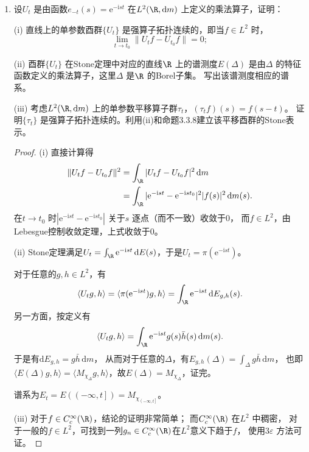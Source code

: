 \begin{enumerate}

\item[1]
设$ U_{t} $ 是由函数$ e_{-t}(s) = \mathrm{e}^{-\mathrm{i}st} $ 在$ L^{2}(\R, \mathrm{d}m) $ 上定义的乘法算子，证明：

(i) 直线上的单参数酉群$ \{U_{t}\} $ 是强算子拓扑连续的，即当$ f\in L^{2} $ 时，
$$\lim_{t\to t_{0}} \|U_{t}f-U_{t_{0}}f\| = 0;$$

(ii) 酉群$ \{U_{t}\} $ 在Stone定理中对应的直线$ \R $ 上的谱测度$ E(\Delta) $ 是由$ \Delta $ 的特征函数定义的乘法算子，这里$ \Delta $ 是$ \R $ 的Borel子集。
写出该谱测度相应的谱系。

(iii) 考虑$ L^{2}(\R, \mathrm{d}m) $ 上的单参数平移算子群$ \tau_{t} $，$ (\tau_{t}f)(s) = f(s-t) $。
证明$ \{\tau_{t}\} $ 是强算子拓扑连续的。利用(ii)和命题3.3.8建立该平移酉群的Stone表示。

\begin{proof}
(i) 直接计算得
\begin{align*}
    \| U_{t}f-U_{t_{0}}f \|^{2} &= \int_{\R}{|U_{t}f-U_{t_{0}}f|^{2}\,\mathrm{d}m} \\
    &= \int_{\R}{|\mathrm{e}^{-\mathrm{i}st}-\mathrm{e}^{-\mathrm{i}st_{0}}|^{2}|f(s)|^{2}\,\mathrm{d}m(s)}.
\end{align*}
在$ t\to t_{0} $ 时$ |\mathrm{e}^{-\mathrm{i}st}-\mathrm{e}^{-\mathrm{i}st_{0}}| $ 关于$ s $ 逐点（而不一致）收敛于$ 0 $，
而$ f\in L^{2} $，由Lebesgue控制收敛定理，上式收敛于$ 0 $。

(ii) Stone定理满足$ U_{t} = \int_{\R}{\mathrm{e}^{-\mathrm{i}st}\,\mathrm{d}E(s)} $，于是$ U_{t} = \pi(\mathrm{e}^{-\mathrm{i}st}) $。

对于任意的$ g,h\in L^{2} $，有
$$
 \langle U_{t}g,h \rangle = \langle \pi(\mathrm{e}^{-\mathrm{i}st})g,h \rangle 
 = \int_{\R}{\mathrm{e}^{-\mathrm{i}st}\,\mathrm{d}E_{g,h}(s)}.
$$ 
另一方面，按定义有
$$
 \langle U_{t}g,h \rangle = \int_{\R}{\mathrm{e}^{-\mathrm{i}st}g(s)\bar{h}(s)\,\mathrm{d}m(s)}.
$$ 
于是有$ \mathrm{d}E_{g,h} = g\bar{h}\,\mathrm{d}m $，
从而对于任意的$ \Delta $，有$ E_{g,h}(\Delta) = \int_{\Delta}{g\bar{h}\,\mathrm{d}m} $，
也即$ \langle E(\Delta)g,h \rangle = \langle M_{\chi_{\Delta}}g,h \rangle $，故$ E(\Delta) = M_{\chi_{\Delta}} $，证完。

谱系为$ E_{t} = E(\left(-\infty,t\right]) = M_{\chi_{\left(-\infty,t\right]}} $。

(iii) 对于$ f\in C_{c}^{\infty}(\R) $，结论的证明非常简单；
而$ C_{c}^{\infty}(\R) $ 在$ L^{2} $ 中稠密，
对于一般的$ f\in L^{2} $，可找到一列$ g_n \in C_c^\infty(\R) $在$L^2$意义下趋于$f$，
使用$ 3\varepsilon $ 方法可证。


\end{proof}
\end{enumerate}
